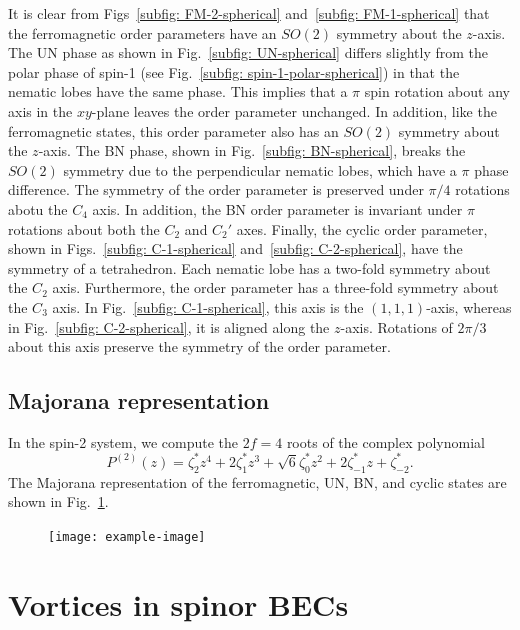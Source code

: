 It is clear from Figs~\ref{subfig: FM-2-spherical}
and~\ref{subfig: FM-1-spherical} that the ferromagnetic order parameters have
an \(SO(2)\) symmetry about the \(z\)-axis.
The UN phase as shown in Fig.~\ref{subfig: UN-spherical} differs slightly from
the polar phase of spin-1 (see Fig.~\ref{subfig: spin-1-polar-spherical}) in
that the nematic lobes have the same phase.
This implies that a \(\pi \) spin rotation about any axis in the \(xy\)-plane
leaves the order parameter unchanged.
In addition, like the ferromagnetic states, this order parameter also has an
\(SO(2)\) symmetry about the \(z\)-axis.
The BN phase, shown in Fig.~\ref{subfig: BN-spherical}, breaks the \(SO(2)\)
symmetry due to the perpendicular nematic lobes, which have a \(\pi \) phase
difference.
The symmetry of the order parameter is preserved under \(\pi/4\) rotations
abotu the \(C_4\) axis.
In addition, the BN order parameter is invariant under \(\pi \) rotations about
both the \(C_2\) and \(C_2'\) axes.
Finally, the cyclic order parameter, shown in Figs.~\ref{subfig: C-1-spherical}
and~\ref{subfig: C-2-spherical}, have the symmetry of a tetrahedron.
Each nematic lobe has a two-fold symmetry about the \(C_2\) axis.
Furthermore, the order parameter has a three-fold symmetry about the \(C_3\)
axis.
In Fig.~\ref{subfig: C-1-spherical}, this axis is the \((1, 1, 1)\)-axis,
whereas in Fig.~\ref{subfig: C-2-spherical}, it is aligned along the \(z\)-axis.
Rotations of \(2\pi/3\) about this axis preserve the symmetry of the order
parameter.

\subsection{Majorana representation}
In the spin-2 system, we compute the \(2f=4\) roots of the complex polynomial
\begin{equation}
    P^{(2)}(z) = \zeta_2^*z^4 + 2\zeta_1^*z^3 + \sqrt{6}\zeta_0^*z^2
    + 2\zeta_{-1}^*z + \zeta_{-2}^*.
\end{equation}
The Majorana representation of the ferromagnetic, UN, BN, and cyclic states
are shown in Fig.~\ref{fig: spin-2-Majorana}.
\begin{figure}
    \centering
    \texttt{[image: example-image]}
    \caption{\label{fig: spin-2-Majorana}}
\end{figure}

\section{Vortices in spinor BECs}

